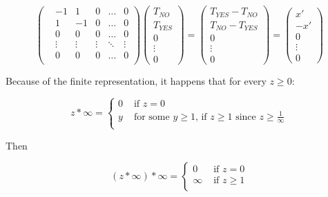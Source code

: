 \begin{equation*}
    \left(\begin{matrix}
        &-1     &1      &0      &\dots  &0      \\
        &1      &-1     &0      &\dots  &0      \\
        &0      &0      &0      &\dots  &0      \\
        &\vdots &\vdots &\vdots &\ddots &\vdots \\
        &0      &0      &0      &\dots  &0      \\
    \end{matrix}\right) 
    \left(\begin{matrix}
        T_{NO} \\
        T_{YES} \\ 
        0 \\
        \vdots \\
        0
    \end{matrix}\right) = 
    \left(\begin{matrix}
        T_{YES} - T_{NO} \\
        T_{NO} - T_{YES} \\ 
        0 \\
        \vdots \\
        0
    \end{matrix}\right)=
    \left(\begin{matrix}
        x' \\
        -x' \\ 
        0 \\
        \vdots \\
        0
    \end{matrix}\right)
\end{equation*}



Because of the finite representation, it happens that for every $z \ge 0$:

\[z *\infty = \begin{cases}
    0   &\text{ if } z = 0 \\
    y   &\text{ for some } y \ge 1 \text{, if } z \ge 1 \text{ since } z \ge \frac{1}{\infty} \\
\end{cases}\]

Then

\[(z *\infty) *\infty= \begin{cases}
    0       &\text{ if } z = 0 \\
    \infty  &\text{ if } z \ge 1 \\
\end{cases}\]

